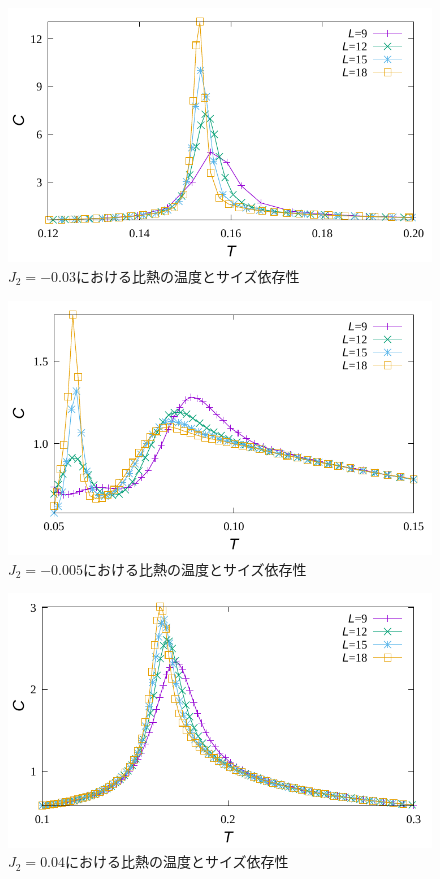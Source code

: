 \documentclass[12pt,titlepage,dvipdfmx]{jarticle}
\begin{document}
\begin{figure}[H]
   \centering
   \includegraphics[width=12cm]{figure/c_j2_-3e-2.pdf}
   \caption{$J_2=-0.03$における比熱の温度とサイズ依存性}
\end{figure}

\begin{figure}[H]
   \centering
   \includegraphics[width=12cm]{figure/c_j2_-5e-3.pdf}
   \caption{$J_2=-0.005$における比熱の温度とサイズ依存性}
\end{figure}

\begin{figure}[H]
   \centering
   \includegraphics[width=12cm]{figure/c_j2_4e-2.pdf}
   \caption{$J_2=0.04$における比熱の温度とサイズ依存性}
\end{figure}
\end{document}
